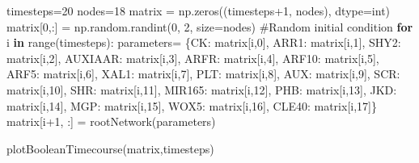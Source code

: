 \documentclass[
  letterpaper,
  DIV=11,
  numbers=noendperiod]{scrreprt}
\newenvironment{Shaded}{\begin{snugshade}}{\end{snugshade}}
\newcommand{\BuiltInTok}[1]{\textcolor[rgb]{0.00,0.23,0.31}{#1}}
\newcommand{\CommentTok}[1]{\textcolor[rgb]{0.37,0.37,0.37}{#1}}
\newcommand{\ControlFlowTok}[1]{\textcolor[rgb]{0.00,0.23,0.31}{\textbf{#1}}}
\newcommand{\DecValTok}[1]{\textcolor[rgb]{0.68,0.00,0.00}{#1}}
\newcommand{\KeywordTok}[1]{\textcolor[rgb]{0.00,0.23,0.31}{\textbf{#1}}}
\newcommand{\NormalTok}[1]{\textcolor[rgb]{0.00,0.23,0.31}{#1}}
\newcommand{\OperatorTok}[1]{\textcolor[rgb]{0.37,0.37,0.37}{#1}}
\newcommand{\StringTok}[1]{\textcolor[rgb]{0.13,0.47,0.30}{#1}}
\theoremstyle{definition}
\theoremstyle{remark}
\begin{document}
\begin{Shaded}
\begin{Highlighting}[]
\NormalTok{timesteps}\OperatorTok{=}\DecValTok{20}
\NormalTok{nodes}\OperatorTok{=}\DecValTok{18}
\NormalTok{matrix }\OperatorTok{=}\NormalTok{ np.zeros((timesteps}\OperatorTok{+}\DecValTok{1}\NormalTok{, nodes), dtype}\OperatorTok{=}\BuiltInTok{int}\NormalTok{) }
\NormalTok{matrix[}\DecValTok{0}\NormalTok{,:] }\OperatorTok{=}\NormalTok{ np.random.randint(}\DecValTok{0}\NormalTok{, }\DecValTok{2}\NormalTok{, size}\OperatorTok{=}\NormalTok{nodes) }\CommentTok{\#Random initial condition}
\ControlFlowTok{for}\NormalTok{ i }\KeywordTok{in} \BuiltInTok{range}\NormalTok{(timesteps):}
\NormalTok{    parameters}\OperatorTok{=}\NormalTok{ \{}\StringTok{\textquotesingle{}CK\textquotesingle{}}\NormalTok{: matrix[i,}\DecValTok{0}\NormalTok{], }\StringTok{\textquotesingle{}ARR1\textquotesingle{}}\NormalTok{: matrix[i,}\DecValTok{1}\NormalTok{], }\StringTok{\textquotesingle{}SHY2\textquotesingle{}}\NormalTok{: matrix[i,}\DecValTok{2}\NormalTok{], }\StringTok{\textquotesingle{}AUXIAAR\textquotesingle{}}\NormalTok{: matrix[i,}\DecValTok{3}\NormalTok{], }\StringTok{\textquotesingle{}ARFR\textquotesingle{}}\NormalTok{: matrix[i,}\DecValTok{4}\NormalTok{], }\StringTok{\textquotesingle{}ARF10\textquotesingle{}}\NormalTok{: matrix[i,}\DecValTok{5}\NormalTok{], }\StringTok{\textquotesingle{}ARF5\textquotesingle{}}\NormalTok{: matrix[i,}\DecValTok{6}\NormalTok{], }\StringTok{\textquotesingle{}XAL1\textquotesingle{}}\NormalTok{: matrix[i,}\DecValTok{7}\NormalTok{], }\StringTok{\textquotesingle{}PLT\textquotesingle{}}\NormalTok{: matrix[i,}\DecValTok{8}\NormalTok{], }\StringTok{\textquotesingle{}AUX\textquotesingle{}}\NormalTok{: matrix[i,}\DecValTok{9}\NormalTok{], }\StringTok{\textquotesingle{}SCR\textquotesingle{}}\NormalTok{: matrix[i,}\DecValTok{10}\NormalTok{], }\StringTok{\textquotesingle{}SHR\textquotesingle{}}\NormalTok{: matrix[i,}\DecValTok{11}\NormalTok{], }\StringTok{\textquotesingle{}MIR165\textquotesingle{}}\NormalTok{: matrix[i,}\DecValTok{12}\NormalTok{], }\StringTok{\textquotesingle{}PHB\textquotesingle{}}\NormalTok{: matrix[i,}\DecValTok{13}\NormalTok{], }\StringTok{\textquotesingle{}JKD\textquotesingle{}}\NormalTok{: matrix[i,}\DecValTok{14}\NormalTok{], }\StringTok{\textquotesingle{}MGP\textquotesingle{}}\NormalTok{: matrix[i,}\DecValTok{15}\NormalTok{], }\StringTok{\textquotesingle{}WOX5\textquotesingle{}}\NormalTok{: matrix[i,}\DecValTok{16}\NormalTok{], }\StringTok{\textquotesingle{}CLE40\textquotesingle{}}\NormalTok{: matrix[i,}\DecValTok{17}\NormalTok{]\}}
\NormalTok{    matrix[i}\OperatorTok{+}\DecValTok{1}\NormalTok{, :] }\OperatorTok{=}\NormalTok{ rootNetwork(parameters)}

\NormalTok{plotBooleanTimecourse(matrix,timesteps)}
\end{Highlighting}
\end{Shaded}
\end{document}
